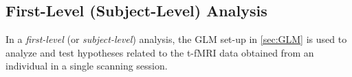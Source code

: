 %

\subsection{First-Level (Subject-Level) Analysis}

In a \textit{first-level} (or \textit{subject-level}) analysis, the GLM set-up in \ref{sec:GLM} is used to analyze and test hypotheses related to the t-fMRI data obtained from an individual in a single scanning session. 

